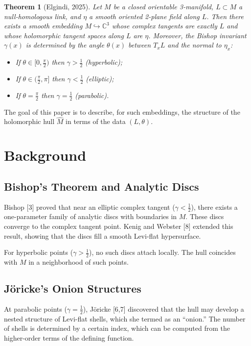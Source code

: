 \documentclass{amsart}
\newtheorem{theorem}{Theorem}
\newcommand{\C}{\mathbb{C}}
\newcommand{\hatM}{\widehat{M}}
\begin{document}
\begin{theorem}[Elgindi, 2025]
Let $M$ be a closed orientable 3-manifold, $L \subset M$ a null-homologous link, and $\eta$ a smooth oriented 2-plane field along $L$. Then there exists a smooth embedding $M \hookrightarrow \C^3$ whose complex tangents are exactly $L$ and whose holomorphic tangent spaces along $L$ are $\eta$. Moreover, the Bishop invariant $\gamma(x)$ is determined by the angle $\theta(x)$ between $T_xL$ and the normal to $\eta_x$:
\begin{itemize}
\item If $\theta \in [0, \frac{\pi}{2})$ then $\gamma > \frac{1}{2}$ (hyperbolic);
\item If $\theta \in (\frac{\pi}{2}, \pi]$ then $\gamma < \frac{1}{2}$ (elliptic);
\item If $\theta = \frac{\pi}{2}$ then $\gamma = \frac{1}{2}$ (parabolic).
\end{itemize}
\end{theorem}

The goal of this paper is to describe, for such embeddings, the structure of the holomorphic hull $\hatM$ in terms of the data $(L, \theta)$.

\section{Background}

\subsection{Bishop's Theorem and Analytic Discs}

Bishop [3] proved that near an elliptic complex tangent ($\gamma < \frac{1}{2}$), there exists a one-parameter family of analytic discs with boundaries in $M$. These discs converge to the complex tangent point. Kenig and Webster [8] extended this result, showing that the discs fill a smooth Levi-flat hypersurface.

For hyperbolic points ($\gamma > \frac{1}{2}$), no such discs attach locally. The hull coincides with $M$ in a neighborhood of such points.

\subsection{Jöricke's Onion Structures}

At parabolic points ($\gamma = \frac{1}{2}$),  Jöricke [6,7] discovered that the hull may develop a nested structure of Levi-flat shells, which she termed as an ``onion.'' The number of shells is determined by a certain index, which can be computed from the higher-order terms of the defining function.
\end{document}
